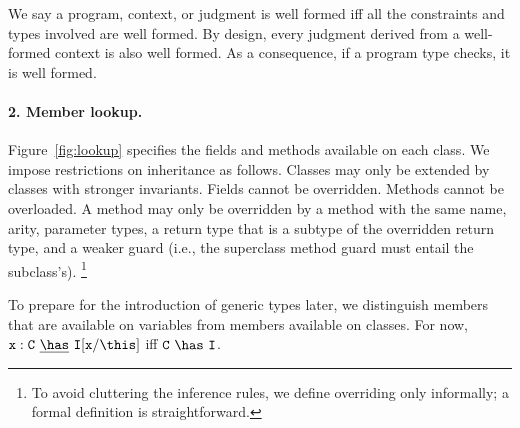 We say a program, context, or judgment is well formed iff all the constraints and types involved are well formed. By design, every judgment derived from a well-formed context is also well formed. As a consequence, if a program type checks, it is well formed.

\paragraph{2. Member lookup.} Figure~\ref{fig:lookup} specifies the fields and methods available on each class. We impose restrictions on inheritance as follows. Classes may only be extended by classes with stronger invariants. Fields cannot be overridden. Methods cannot be overloaded.
A method may only be overridden by a method with the same name,
arity, parameter types, a return type that is a subtype of the
overridden return type, and a weaker guard (i.e., the superclass
method guard must entail the subclass's).
\footnote{To avoid cluttering the inference rules, we
define overriding only informally; a formal definition is
straightforward.}

To prepare for the introduction of generic types later, we
distinguish members that are available on variables from members
available on classes.  For now,
${\tt x}:{\tt C}~\underline\has~{\tt I}[{\tt x}/\this]$ iff ${\tt C}~\has~{\tt I}$.

